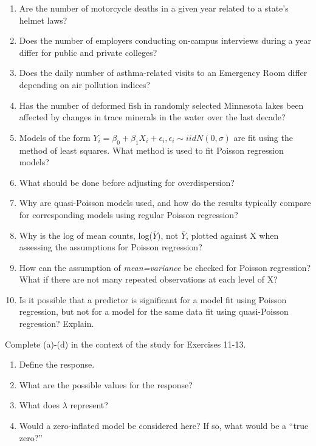 \documentclass[
]{krantz}
\providecommand{\tightlist}{%
  \setlength{\itemsep}{0pt}\setlength{\parskip}{0pt}}
\begin{document}
\begin{enumerate}
\def\labelenumi{\arabic{enumi}.}
\tightlist
\item
  Are the number of motorcycle deaths in a given year related to a state's helmet laws?
\item
  Does the number of employers conducting on-campus interviews during a year differ for public and private colleges?
\item
  Does the daily number of asthma-related visits to an Emergency Room differ depending on air pollution indices?
\item
  Has the number of deformed fish in randomly selected Minnesota lakes been affected by changes in trace minerals in the water over the last decade?
  \vspace{3mm}
\item
  Models of the form \(Y_i=\beta_0+\beta_1X_i+\epsilon_i, \epsilon_i \sim iidN(0,\sigma)\) are fit using the method of least squares. What method is used to fit Poisson regression models?
\item
  What should be done before adjusting for overdispersion?
\item
  Why are quasi-Poisson models used, and how do the results typically compare for corresponding models using regular Poisson regression?
\item
  Why is the log of mean counts, log(\(\bar{Y}\)), not \(\bar{Y}\), plotted against X when assessing the assumptions for Poisson regression?
\item
  How can the assumption of \emph{mean=variance} be checked for Poisson regression? What if there are not many repeated observations at each level of X?
\item
  Is it possible that a predictor is significant for a model fit using Poisson regression, but not for a model for the same data fit using quasi-Poisson regression? Explain.
\end{enumerate}

Complete (a)-(d) in the context of the study for Exercises 11-13.

\begin{enumerate}
\def\labelenumi{\alph{enumi}.}
\tightlist
\item
  Define the response.
\item
  What are the possible values for the response?
\item
  What does \(\lambda\) represent?
\item
  Would a zero-inflated model be considered here? If so, what would be a ``true zero?''
\end{enumerate}
\end{document}
